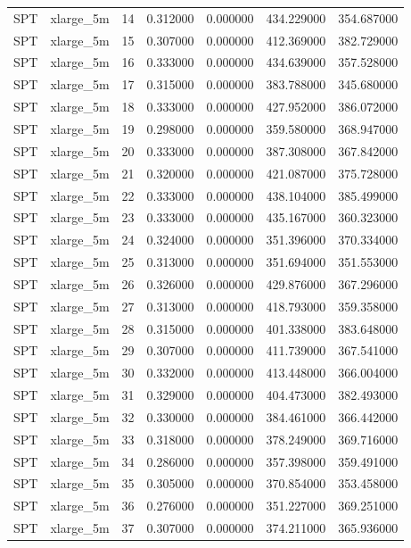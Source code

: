 \begin{tabular}{llrrrrr}
SPT & xlarge_5m & 14 & 0.312000 & 0.000000 & 434.229000 & 354.687000 \\
SPT & xlarge_5m & 15 & 0.307000 & 0.000000 & 412.369000 & 382.729000 \\
SPT & xlarge_5m & 16 & 0.333000 & 0.000000 & 434.639000 & 357.528000 \\
SPT & xlarge_5m & 17 & 0.315000 & 0.000000 & 383.788000 & 345.680000 \\
SPT & xlarge_5m & 18 & 0.333000 & 0.000000 & 427.952000 & 386.072000 \\
SPT & xlarge_5m & 19 & 0.298000 & 0.000000 & 359.580000 & 368.947000 \\
SPT & xlarge_5m & 20 & 0.333000 & 0.000000 & 387.308000 & 367.842000 \\
SPT & xlarge_5m & 21 & 0.320000 & 0.000000 & 421.087000 & 375.728000 \\
SPT & xlarge_5m & 22 & 0.333000 & 0.000000 & 438.104000 & 385.499000 \\
SPT & xlarge_5m & 23 & 0.333000 & 0.000000 & 435.167000 & 360.323000 \\
SPT & xlarge_5m & 24 & 0.324000 & 0.000000 & 351.396000 & 370.334000 \\
SPT & xlarge_5m & 25 & 0.313000 & 0.000000 & 351.694000 & 351.553000 \\
SPT & xlarge_5m & 26 & 0.326000 & 0.000000 & 429.876000 & 367.296000 \\
SPT & xlarge_5m & 27 & 0.313000 & 0.000000 & 418.793000 & 359.358000 \\
SPT & xlarge_5m & 28 & 0.315000 & 0.000000 & 401.338000 & 383.648000 \\
SPT & xlarge_5m & 29 & 0.307000 & 0.000000 & 411.739000 & 367.541000 \\
SPT & xlarge_5m & 30 & 0.332000 & 0.000000 & 413.448000 & 366.004000 \\
SPT & xlarge_5m & 31 & 0.329000 & 0.000000 & 404.473000 & 382.493000 \\
SPT & xlarge_5m & 32 & 0.330000 & 0.000000 & 384.461000 & 366.442000 \\
SPT & xlarge_5m & 33 & 0.318000 & 0.000000 & 378.249000 & 369.716000 \\
SPT & xlarge_5m & 34 & 0.286000 & 0.000000 & 357.398000 & 359.491000 \\
SPT & xlarge_5m & 35 & 0.305000 & 0.000000 & 370.854000 & 353.458000 \\
SPT & xlarge_5m & 36 & 0.276000 & 0.000000 & 351.227000 & 369.251000 \\
SPT & xlarge_5m & 37 & 0.307000 & 0.000000 & 374.211000 & 365.936000 \\

\end{tabular}
